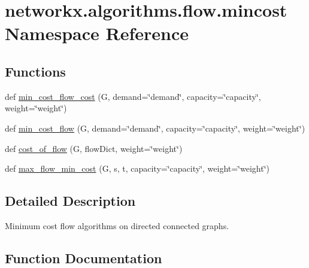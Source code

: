 \hypertarget{namespacenetworkx_1_1algorithms_1_1flow_1_1mincost}{}\section{networkx.\+algorithms.\+flow.\+mincost Namespace Reference}
\label{namespacenetworkx_1_1algorithms_1_1flow_1_1mincost}
\subsection*{Functions}
\begin{DoxyCompactItemize}
\item 
def \hyperlink{namespacenetworkx_1_1algorithms_1_1flow_1_1mincost_aeb9bc47d477c57c0b0bd04161bae05bc}{min\+\_\+cost\+\_\+flow\+\_\+cost} (G, demand=\char`\"{}demand\char`\"{}, capacity=\char`\"{}capacity\char`\"{}, weight=\char`\"{}weight\char`\"{})
\item 
def \hyperlink{namespacenetworkx_1_1algorithms_1_1flow_1_1mincost_a891a006d4dc407fcf160c6d6be7e66d4}{min\+\_\+cost\+\_\+flow} (G, demand=\char`\"{}demand\char`\"{}, capacity=\char`\"{}capacity\char`\"{}, weight=\char`\"{}weight\char`\"{})
\item 
def \hyperlink{namespacenetworkx_1_1algorithms_1_1flow_1_1mincost_ac4f6e84c98d8ab823c1d0334d8034757}{cost\+\_\+of\+\_\+flow} (G, flow\+Dict, weight=\char`\"{}weight\char`\"{})
\item 
def \hyperlink{namespacenetworkx_1_1algorithms_1_1flow_1_1mincost_a25a42d78cf61bb03df04a91acc9484da}{max\+\_\+flow\+\_\+min\+\_\+cost} (G, s, t, capacity=\char`\"{}capacity\char`\"{}, weight=\char`\"{}weight\char`\"{})
\end{DoxyCompactItemize}


\subsection{Detailed Description}
\begin{DoxyVerb}Minimum cost flow algorithms on directed connected graphs.
\end{DoxyVerb}
 

\subsection{Function Documentation}
\mbox{\label{namespacenetworkx_1_1algorithms_1_1flow_1_1mincost_ac4f6e84c98d8ab823c1d0334d8034757}} 
